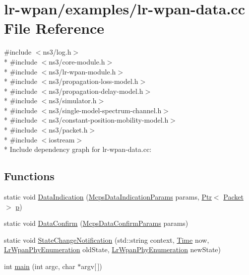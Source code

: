 \hypertarget{lr-wpan-data_8cc}{}\section{lr-\/wpan/examples/lr-\/wpan-\/data.cc File Reference}
\label{lr-wpan-data_8cc}
{\ttfamily \#include $<$ns3/log.\+h$>$}\\*
{\ttfamily \#include $<$ns3/core-\/module.\+h$>$}\\*
{\ttfamily \#include $<$ns3/lr-\/wpan-\/module.\+h$>$}\\*
{\ttfamily \#include $<$ns3/propagation-\/loss-\/model.\+h$>$}\\*
{\ttfamily \#include $<$ns3/propagation-\/delay-\/model.\+h$>$}\\*
{\ttfamily \#include $<$ns3/simulator.\+h$>$}\\*
{\ttfamily \#include $<$ns3/single-\/model-\/spectrum-\/channel.\+h$>$}\\*
{\ttfamily \#include $<$ns3/constant-\/position-\/mobility-\/model.\+h$>$}\\*
{\ttfamily \#include $<$ns3/packet.\+h$>$}\\*
{\ttfamily \#include $<$iostream$>$}\\*
Include dependency graph for lr-\/wpan-\/data.cc\+:
\subsection*{Functions}
\begin{DoxyCompactItemize}
\item 
static void \hyperlink{lr-wpan-data_8cc_a910681814411efb730f34de800607624}{Data\+Indication} (\hyperlink{structns3_1_1McpsDataIndicationParams}{Mcps\+Data\+Indication\+Params} params, \hyperlink{classns3_1_1Ptr}{Ptr}$<$ \hyperlink{classns3_1_1Packet}{Packet} $>$ \hyperlink{lte__link__budget__x2__handover__measures_8m_ac9de518908a968428863f829398a4e62}{p})
\item 
static void \hyperlink{lr-wpan-data_8cc_a2007bf71d36faa06c946470857adc7f0}{Data\+Confirm} (\hyperlink{structns3_1_1McpsDataConfirmParams}{Mcps\+Data\+Confirm\+Params} params)
\item 
static void \hyperlink{lr-wpan-data_8cc_aed2e31e36ab5372d8c92e97e5e4215ae}{State\+Change\+Notification} (std\+::string context, \hyperlink{classns3_1_1Time}{Time} now, \hyperlink{group__lr-wpan_ga6494269d13d45c511a07b7ccbb1de754}{Lr\+Wpan\+Phy\+Enumeration} old\+State, \hyperlink{group__lr-wpan_ga6494269d13d45c511a07b7ccbb1de754}{Lr\+Wpan\+Phy\+Enumeration} new\+State)
\item 
int \hyperlink{lr-wpan-data_8cc_a0ddf1224851353fc92bfbff6f499fa97}{main} (int argc, char $\ast$argv\mbox{[}$\,$\mbox{]})
\end{DoxyCompactItemize}


